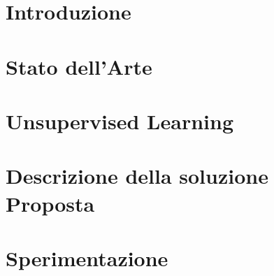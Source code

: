 \documentclass[a4paper,12pt,oneside]{book}
\begin{document}
\chapter{Introduzione}
\label{cap:capitolo1}



\chapter{Stato dell'Arte}
\label{cap:capitolo2}




\chapter{Unsupervised Learning}
\label{cap:capitolo3}



\chapter{Descrizione della soluzione Proposta}
\label{cap:capitolo4}


\chapter{Sperimentazione}
\label{cap:capitolo5}



%
%
%

\end{document}
